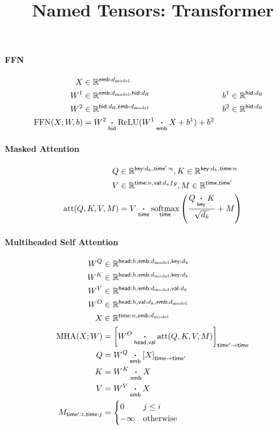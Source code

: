 \documentclass{article}
\title{Named Tensors: Transformer}
\date{}
\newcommand{\reals}[0]{\mathbb{R}}
\newcommand{\dmodel}{d_{\text{model}}}
\newcommand{\dff}{d_{\text{ff}}}
\begin{document}
\maketitle


\paragraph{FFN}
\begin{align*}
X &\in \reals^{\nset{emb}{\dmodel}} \\
W^1 &\in \reals^{\nset{emb}{\dmodel, \nset{hid}}{\dff}} & 
b^1 &\in \reals^{\nset{hid}{\dff}} \\
W^2 & \in \reals^{\nset{hid}{\dff}, \nset{emb}{\dmodel}} & b^2 &\in \reals^{\nset{hid}{\dff}} \\
\text{FFN}(X; W, b) &=  W^2 \ndot{hid} \text{ReLU}(W^1 \ndot{emb} X + b^1) + b^2
\end{align*}

\paragraph{Masked Attention}
\begin{align*} 
Q &\in \reals^{\nset{key}{d_k}, \nset{time'}{n}}, K \in \reals^{\nset{key}{d_k}, \nset{time}{n}}\\
V &\in \reals^{\nset{time}{n}, \nset{val}{d_v}fg
},
M \in \reals^{\name{time}, \name{time'}}\\
\text{att}(Q, K, V, M) &=  V \ndot{time} \nfun{time}{softmax} \left( \frac{\displaystyle Q \ndot{key} K }{\sqrt{d_k}} + M \right) 
\end{align*}

\paragraph{Multiheaded Self Attention}
\begin{align*}
  W^Q &\in \mathbb{R}^{\nset{head}{h}, \nset{emb}{\dmodel}, \nset{key}{d_k}} \\
  W^K &\in \mathbb{R}^{\nset{head}{h}, \nset{emb}{\dmodel}, \nset{key}{d_k}} \\
  W^V &\in \mathbb{R}^{\nset{head}{h}, \nset{emb}{\dmodel}, \nset{val}{d_k}} \\
  W^O &\in \mathbb{R}^{\nset{head}{h}, \nset{val}{d_k}, \nset{emb}{\dmodel}} \\
  X &\in \mathbb{R}^{\nset{time}{n}, \nset{emb}{\dmodel}} \\
  \text{MHA}(X; W) &= \nmov{time'}{time}{W^O \ndot{head,val} \text{att}(Q, K, V, M)} \\
  Q &= W^Q \ndot{emb} \nmov{time}{time'}{X} \\
  K &= W^K \ndot{emb} X \\
  V &= W^V \ndot{emb} X \\
  M_{\nidx{time'}{i}, \nset{time}{j}} &= \begin{cases} 0 & j\leq i \\ -\infty & \text{otherwise} \end{cases}   
\end{align*}
\end{document}
